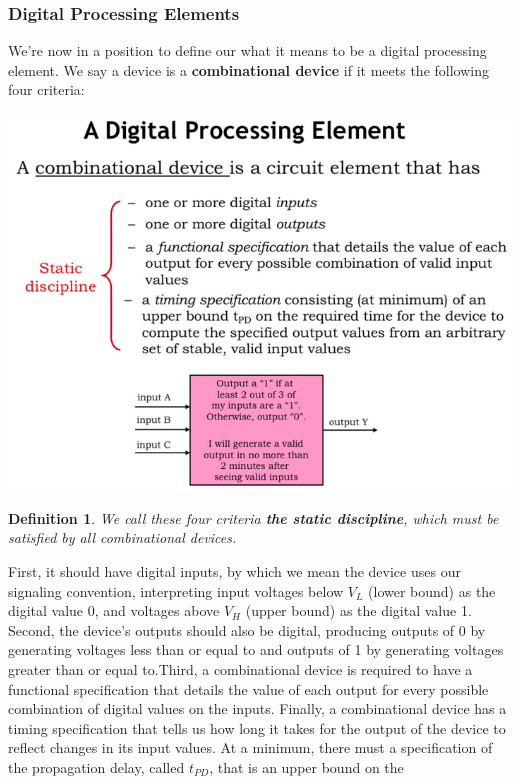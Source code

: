 \documentclass[a4paper,twoside]{article}
\newtheorem{definition}[theorem]{Definition}
\numberwithin{equation}{section}
\begin{document}
\subsubsection{Digital Processing Elements}
We're now in a position to define our what it means to be a digital processing element.
We say a device is a \textbf{combinational device} if it meets the following four criteria:
\begin{center}
    \includegraphics[scale=0.4]{assets/digital_processing_el.png}
\end{center}
\begin{definition}
    We call these four criteria \textbf{the static discipline}, which must be satisfied by all
    combinational devices.
\end{definition}
First, it should have digital inputs, by which we mean the device uses our signaling convention,
interpreting input voltages below $V_L$ (lower bound) as the digital value 0, and voltages above $V_H$
(upper bound) as the digital value 1. Second, the device's outputs should also be digital,
producing outputs of 0 by generating voltages less than or equal to and outputs of 1
by generating voltages greater than or equal to.Third, a combinational device is required to
have a functional specification that details the value of each output for every possible combination
of digital values on the inputs. Finally, a combinational device has a timing specification that tells
us how long it takes for the output of the device to reflect changes in its input values. At a minimum,
there must a specification of the propagation delay, called $t_{PD}$, that is an upper bound on the
\end{document}
